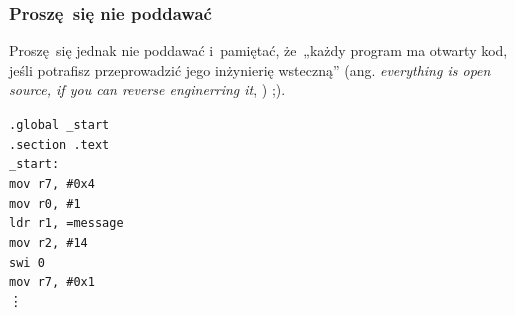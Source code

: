 \documentclass[10pt,t]{beamer}
\begin{document}
\begin{frame}
  \frametitle{Proszę~się nie poddawać}


  Proszę~się jednak nie poddawać i~pamiętać, że~„każdy program ma otwarty
  kod, jeśli potrafisz przeprowadzić jego inżynierię wsteczną” (ang.
  \textit{everything is open source, if you can reverse enginerring it},
  \parencite{???}) ;).

  \vspace{1.5em}





  \texttt{.global \_start} \\
  \texttt{.section .text} \\



  \texttt{\_start:} \\[-0.2em]
  \hphantom{aaaaaaaa} \texttt{mov r7, \#0x4} \\
  \hphantom{aaaaaaaa} \texttt{mov r0, \#1} \\
  \hphantom{aaaaaaaa} \texttt{ldr r1, =message} \\
  \hphantom{aaaaaaaa} \texttt{mov r2, \#14} \\

  \hphantom{aaaaaaaa} \texttt{swi 0} \\

  \hphantom{aaaaaaaa} \texttt{mov r7, \#0x1} \\
  \hspace{5em} \vdots





\end{frame}





\end{document}
